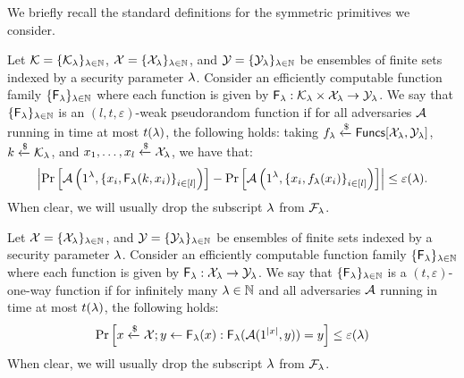 We briefly recall the standard definitions for the symmetric primitives we consider.

\begin{definition}
Let $\mathcal{K} = \{\mathcal{K}_\lambda\}_{\lambda \in \mathbb{N}}$, $\mathcal{X} = \{\mathcal{X}_\lambda\}_{\lambda \in \mathbb{N}}$, and $\mathcal{Y} = \{\mathcal{Y}_\lambda\}_{\lambda \in \mathbb{N}}$ be ensembles of finite sets indexed by a security parameter $\lambda$. Consider an efficiently computable function family $\{\mathsf{F}_\lambda\}_{\lambda \in \mathbb{N}}$ where each function is given by $\mathsf{F}_\lambda: \mathcal{K}_\lambda \times \mathcal{X}_\lambda \to \mathcal{Y}_\lambda$.
We say that $\{\mathsf{F}_\lambda\}_{\lambda \in \mathbb{N}}$ is an $(l, t, \varepsilon)$-weak pseudorandom function if for all adversaries $\mathcal{A}$ running in time at most $t(\lambda)$, the following holds: taking $f_\lambda \xleftarrow{\$} \mathsf{Funcs}[\mathcal{X}_\lambda, \mathcal{Y}_\lambda]$, $k \xleftarrow{\$} \mathcal{K}_\lambda$, and $x_1, \dots, x_l \xleftarrow{\$} \mathcal{X}_\lambda$, we have that:
\[
    \left|\Pr\left[ \mathcal{A}\left(1^\lambda, {\{ x_i, \mathsf{F}_\lambda(k,x_i)\}}_{i \in [l]} \right)\right]
    - \Pr\left[ \mathcal{A}\left(1^\lambda, {\{ x_i, f_\lambda(x_i)\}}_{i \in [l]}\right)\right] \right| \leq \varepsilon(\lambda).
\]
When clear, we will usually drop the subscript $\lambda$ from $\mathcal{F}_\lambda$.
\end{definition}


\begin{definition}
Let $\mathcal{X} = \{\mathcal{X}_\lambda\}_{\lambda \in \mathbb{N}}$, and $\mathcal{Y} = \{\mathcal{Y}_\lambda\}_{\lambda \in \mathbb{N}}$ be ensembles of finite sets indexed by a security parameter $\lambda$. Consider an efficiently computable function family $\{\mathsf{F}_\lambda\}_{\lambda \in \mathbb{N}}$ where each function is given by $\mathsf{F}_\lambda: \mathcal{X}_\lambda \to \mathcal{Y}_\lambda$.
We say that $\{\mathsf{F}_\lambda\}_{\lambda \in \mathbb{N}}$ is a $(t, \varepsilon)$-one-way function if for infinitely many $\lambda \in \mathbb{N}$ and all adversaries $\mathcal{A}$ running in time at most $t(\lambda)$, the following holds:
\[
    \Pr\left[x \xleftarrow{\$} \mathcal{X}; y \gets \mathsf{F}_\lambda(x) : \mathsf{F}_\lambda(\mathcal{A}(1^{\left| {x} \right|}, y)) = y \right] \leq \varepsilon(\lambda)
\]
When clear, we will usually drop the subscript $\lambda$ from $\mathcal{F}_\lambda$.
\end{definition}

\begin{definition}


\end{definition}

